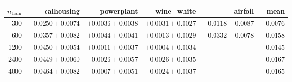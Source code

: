 \begin{tabular}{rrrrrr}
\toprule
$n_{\text{train}}$ & calhousing & powerplant & wine\_white & airfoil & mean \\
\midrule
300 & $-0.0250\pm0.0074$ & $+0.0036\pm0.0038$ & $+0.0031\pm0.0027$ & $-0.0118\pm0.0087$ & $-0.0076$ \\
600 & $-0.0357\pm0.0082$ & $+0.0044\pm0.0041$ & $+0.0013\pm0.0029$ & $-0.0332\pm0.0078$ & $-0.0158$ \\
1200 & $-0.0450\pm0.0054$ & $+0.0011\pm0.0037$ & $+0.0004\pm0.0034$ &  & $-0.0145$ \\
2400 & $-0.0449\pm0.0060$ & $-0.0026\pm0.0057$ & $-0.0026\pm0.0035$ &  & $-0.0167$ \\
4000 & $-0.0464\pm0.0082$ & $-0.0007\pm0.0051$ & $-0.0024\pm0.0037$ &  & $-0.0165$ \\
\bottomrule
\end{tabular}
